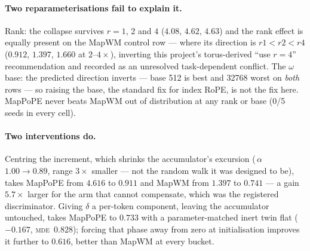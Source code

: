 \documentclass[10pt]{article}
\newcommand{\mde}{\textsc{mde}}
\begin{document}
\paragraph{Two reparameterisations fail to explain it.} Rank: the collapse survives $r=1$, $2$ and $4$
($4.08$, $4.62$, $4.63$) and the rank effect is equally present on the MapWM control row --- where its
direction is $r1 < r2 < r4$ ($0.912$, $1.397$, $1.660$ at $2$--$4\times$), inverting this project's
torus-derived ``use $r=4$'' recommendation and recorded as an unresolved task-dependent conflict. The $\omega$ base:
the predicted direction inverts --- base 512 is best and 32768 worst on \emph{both} rows --- so raising the
base, the standard fix for index RoPE, is not the fix here. MapPoPE never beats MapWM out of distribution at
any rank or base (0/5 seeds in every cell). %

\paragraph{Two interventions do.} Centring the increment, which shrinks the accumulator's excursion
(\,$\alpha$ $1.00\to0.89$, range $3\times$ smaller --- not the random walk it was designed to be), takes MapPoPE from $4.616$ to $0.911$ and MapWM from $1.397$ to $0.741$ --- a gain $5.7\times$
larger for the arm that cannot compensate, which was the registered discriminator. Giving $\delta$ a
per-token component, leaving the accumulator untouched, takes MapPoPE to $0.733$ with a parameter-matched
inert twin flat ($-0.167$, \mde\ $0.828$); forcing that phase away from zero at initialisation improves it
further to $0.616$, better than MapWM at every bucket. %
\end{document}
